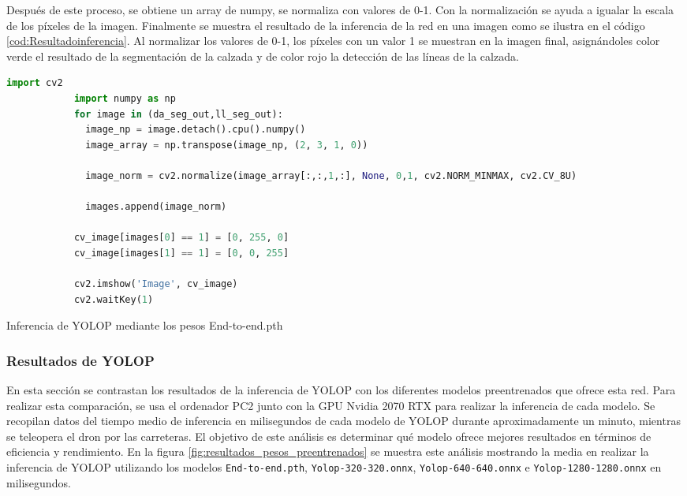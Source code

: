         Después de este proceso, se obtiene un array de numpy, se normaliza con valores de 0-1. Con la normalización 
        se ayuda a igualar la escala de los píxeles de la imagen. Finalmente se muestra el resultado de la inferencia de la red 
        en una imagen como se ilustra en el código \ref{cod:Resultadoinferencia}. Al normalizar los valores de 0-1, los píxeles con un valor 1 se muestran en la imagen final, asignándoles 
        color verde el resultado de la segmentación de la calzada y de color rojo la detección de las líneas de la calzada. 
    
        \begin{code}[H]
          \begin{lstlisting}[language=Python]
            import cv2
            import numpy as np
            for image in (da_seg_out,ll_seg_out):
              image_np = image.detach().cpu().numpy()
              image_array = np.transpose(image_np, (2, 3, 1, 0))
    
              image_norm = cv2.normalize(image_array[:,:,1,:], None, 0,1, cv2.NORM_MINMAX, cv2.CV_8U)
    
              images.append(image_norm)
    
            cv_image[images[0] == 1] = [0, 255, 0]
            cv_image[images[1] == 1] = [0, 0, 255]
    
            cv2.imshow('Image', cv_image)
            cv2.waitKey(1)
          \end{lstlisting}
          \caption[Resultado de la inferencia del modelo YOLOP]{Inferencia de YOLOP mediante los pesos End-to-end.pth}
          \label{cod:Resultadoinferencia}
          \end{code}  


\subsubsection{Resultados de YOLOP }
\label{sec:resultados}
En esta sección se contrastan los resultados de la inferencia de YOLOP con los diferentes modelos preentrenados que ofrece esta red. Para realizar esta comparación, se usa el ordenador 
PC2 junto con la GPU Nvidia 2070 RTX para realizar la inferencia de cada modelo. Se recopilan datos del tiempo medio de inferencia en milisegundos de cada 
modelo de YOLOP durante aproximadamente
un minuto, mientras se teleopera el dron por las carreteras. El objetivo de este análisis es determinar qué modelo ofrece mejores resultados en términos de eficiencia y rendimiento. 
En la figura \ref{fig:resultados_pesos_preentrenados} se muestra este análisis mostrando la media en realizar la inferencia de YOLOP utilizando los modelos 
\texttt{End-to-end.pth}, \texttt{Yolop-320-320.onnx}, \texttt{Yolop-640-640.onnx} e \texttt{Yolop-1280-1280.onnx} en milisegundos.

